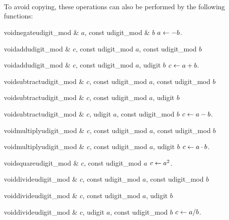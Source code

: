 \begin{center}
\\
\\
\\
\end{center}

To avoid copying, these operations can also be performed by the following functions:

\begin{fcode}{void}{negate}{udigit_mod & $a$, const udigit_mod & $b$}
  $a \leftarrow - b$.
\end{fcode}

\begin{fcode}{void}{add}{udigit_mod & $c$, const udigit_mod $a$, const udigit_mod $b$}\end{fcode}
\begin{fcode}{void}{add}{udigit_mod & $c$, const udigit_mod $a$, udigit $b$}
  $c \leftarrow a + b$.
\end{fcode}

\begin{fcode}{void}{subtract}{udigit_mod & $c$, const udigit_mod $a$, const udigit_mod $b$}\end{fcode}
\begin{fcode}{void}{subtract}{udigit_mod & $c$, const udigit_mod $a$, udigit $b$}\end{fcode}
\begin{fcode}{void}{subtract}{udigit_mod & $c$, udigit $a$, const udigit_mod $b$}
  $c \leftarrow a - b$.
\end{fcode}

\begin{fcode}{void}{multiply}{udigit_mod & $c$, const udigit_mod $a$, const udigit_mod $b$}\end{fcode}
\begin{fcode}{void}{multiply}{udigit_mod & $c$, const udigit_mod $a$, udigit $b$}
  $c \leftarrow a \cdot b$.
\end{fcode}

\begin{fcode}{void}{square}{udigit_mod & $c$, const udigit_mod $a$}
  $c \leftarrow a^2$.
\end{fcode}

\begin{fcode}{void}{divide}{udigit_mod & $c$, const udigit_mod $a$, const udigit_mod $b$}\end{fcode}
\begin{fcode}{void}{divide}{udigit_mod & $c$, const udigit_mod $a$, udigit $b$}\end{fcode}
\begin{fcode}{void}{divide}{udigit_mod & $c$, udigit $a$, const udigit_mod $b$}
  $c \leftarrow a / b$.
\end{fcode}

